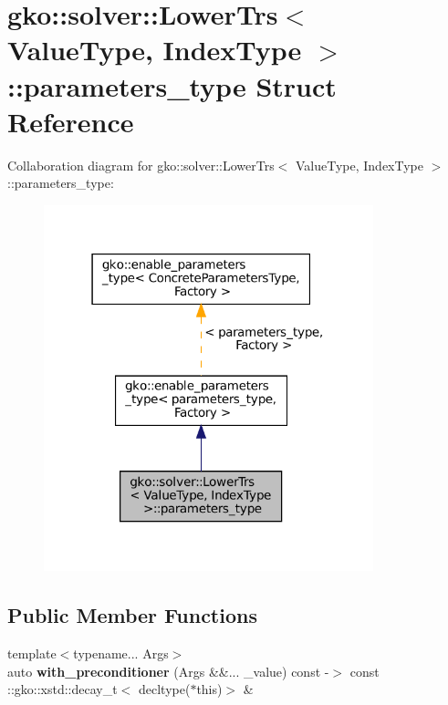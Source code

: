\hypertarget{structgko_1_1solver_1_1LowerTrs_1_1parameters__type}{}\section{gko\+:\+:solver\+:\+:Lower\+Trs$<$ Value\+Type, Index\+Type $>$\+:\+:parameters\+\_\+type Struct Reference}
\label{structgko_1_1solver_1_1LowerTrs_1_1parameters__type}


Collaboration diagram for gko\+:\+:solver\+:\+:Lower\+Trs$<$ Value\+Type, Index\+Type $>$\+:\+:parameters\+\_\+type\+:
\nopagebreak
\begin{figure}[H]
\begin{center}
\leavevmode
\includegraphics[width=271pt]{structgko_1_1solver_1_1LowerTrs_1_1parameters__type__coll__graph}
\end{center}
\end{figure}
\subsection*{Public Member Functions}
\begin{DoxyCompactItemize}
\item 
\mbox{\label{structgko_1_1solver_1_1LowerTrs_1_1parameters__type_a50930ebd4f0b4b1aa220aea402e6013b}} 
{\footnotesize template$<$typename... Args$>$ }\\auto {\bfseries with\+\_\+preconditioner} (Args \&\&... \+\_\+value) const -\/$>$ const \+::gko\+::xstd\+::decay\+\_\+t$<$ decltype($\ast$this)$>$ \&
\end{DoxyCompactItemize}
